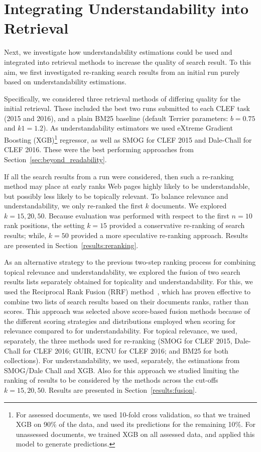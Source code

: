 \section{Integrating Understandability into Retrieval}
\label{sec:experiments}

Next, we investigate how understandability estimations could be used and integrated into retrieval methods to increase the quality of search result. To this aim, we first investigated re-ranking search results from an initial run purely based on understandability estimations. 

Specifically, we considered three retrieval methods of differing quality for the initial retrieval. These included the best two runs submitted to each CLEF task (2015 and 2016), and a plain BM25 baseline (default Terrier parameters: $b=0.75$ and $k1=1.2$). As understandability estimators we used  eXtreme Gradient Boosting (XGB)\footnote{For assessed documents, we used 10-fold cross validation, so that we trained XGB on 90\% of the data, and used its predictions for the remaining 10\%. For unassessed documents, we trained XGB on all assessed data, and applied this model to generate predictions.} regressor, as well as SMOG for CLEF 2015 and Dale-Chall for CLEF 2016. These were the best performing approaches from Section~\ref{sec:beyond_readability}.

If all the search results from a run were considered, then such a re-ranking method may place at early ranks Web pages highly likely to be understandable, but possibly less likely to be topically relevant. To balance relevance and understandability, we only re-ranked the first $k$ documents. We explored $k = 15, 20, 50$. Because evaluation was performed with respect to the first $n=10$ rank positions, the setting $k=15$ provided a conservative re-ranking of search results; while, $k=50$ provided a more speculative re-ranking approach. Results are presented in Section~\ref{results:reranking}.

As an alternative strategy to the previous two-step ranking process for combining topical relevance and understandability, we explored the fusion of two search results lists separately obtained for topicality and understandability.  For this, we used the Reciprocal Rank Fusion (RRF) method~\cite{cormack09}, which has proven effective to combine two lists of search results based on their documents ranks, rather than scores. This approach was selected above score-based fusion methods because of the different scoring strategies and distributions employed when scoring for relevance compared to for understandability. For topical relevance, we used, separately, the three methods used for re-ranking (SMOG for CLEF 2015, Dale-Chall for CLEF 2016; GUIR, ECNU for CLEF 2016; and BM25 for both collections). For understandability, we used, separately, the estimations from SMOG/Dale Chall and XGB. Also for this approach we studied limiting the ranking of results to be considered by the methods across the cut-offs $k=15, 20, 50$. Results are presented in Section~\ref{results:fusion}.

